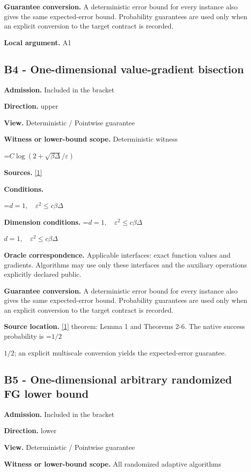\documentclass[10pt,a4paper]{article}
\newcommand{\AtlasMath}[1]{\par\begingroup\centering\setbox0=\hbox{$\displaystyle #1$}\ifdim\wd0>1.4\linewidth\typeout{ATLAS WIDE FORMULA: \the\wd0}\fi\ifdim\wd0>\linewidth\resizebox{\linewidth}{!}{\box0}\else\box0\fi\par\endgroup}
\newcommand{\AtlasInlineMath}[1]{\begingroup\setbox0=\hbox{$#1$}\ifdim\wd0>.4\linewidth\endgroup\AtlasMath{#1}\else\endgroup$#1$\fi}
\begin{document}
\textbf{Guarantee conversion.} A deterministic error bound for every instance also gives the same expected-error bound. Probability guarantees are used only when an explicit conversion to the target contract is recorded.

\textbf{Local argument.} A1

\subsection{B4 - One-dimensional value-gradient bisection}
\textbf{Admission.} Included in the bracket

\textbf{Direction.} upper

\textbf{View.} Deterministic / Pointwise guarantee

\textbf{Witness or lower-bound scope.} Deterministic witness

\AtlasMath{C\log(2+\sqrt{\beta\Delta}/\varepsilon)}
\textbf{Sources.} \href{https://arxiv.org/pdf/2209.07513}{[1]}

\textbf{Conditions.} 
\AtlasMath{d=1,\quad\varepsilon^2\le c\beta\Delta}


\textbf{Dimension conditions.} \AtlasInlineMath{d=1,\quad\varepsilon^2\le c\beta\Delta}

\textbf{Oracle correspondence.} Applicable interfaces: exact function values and gradients. Algorithms may use only these interfaces and the auxiliary operations explicitly declared public.

\textbf{Guarantee conversion.} A deterministic error bound for every instance also gives the same expected-error bound. Probability guarantees are used only when an explicit conversion to the target contract is recorded.

\textbf{Source location.} \href{https://arxiv.org/pdf/2209.07513}{[1]} theorem: Lemma 1 and Theorems 2-6. The native success probability is \AtlasInlineMath{1/2}; an explicit multiscale conversion yields the expected-error guarantee.

\subsection{B5 - One-dimensional arbitrary randomized FG lower bound}
\textbf{Admission.} Included in the bracket

\textbf{Direction.} lower

\textbf{View.} Deterministic / Pointwise guarantee

\textbf{Witness or lower-bound scope.} All randomized adaptive algorithms
\end{document}
